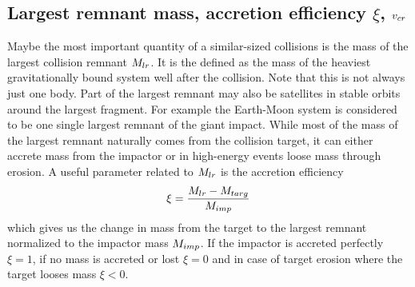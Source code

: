 \subsection{Largest remnant mass, accretion efficiency $\xi$, $v_{cr}$}
Maybe the most important quantity of a similar-sized collisions is the mass of the largest collision remnant $M_{lr}$. It is the defined as the mass of the heaviest gravitationally bound system well after the collision. Note that this is not always just one body. Part of the largest remnant may also be satellites in stable orbits around the largest fragment. For example the Earth-Moon system is considered to be one single largest remnant of the giant impact. While most of the mass of the largest remnant naturally comes from the collision target, it can either accrete mass from the impactor or in high-energy events loose mass through erosion. A useful parameter related to $M_{lr}$ is the accretion efficiency
\begin{equation}
\xi = \frac{M_{lr} - M_{targ}}{M_{imp}}
\end{equation}
which gives us the change in mass from the target to the largest remnant normalized to the impactor mass $M_{imp}$. If the impactor is accreted perfectly $\xi = 1$, if no mass is accreted or lost $\xi = 0$ and in case of target erosion where the target looses mass $\xi < 0$.

